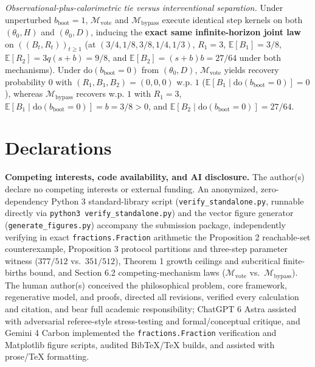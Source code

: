 \documentclass[11pt,letterpaper]{article}
\begin{document}
\emph{Observational-plus-calorimetric tie versus interventional
separation.} Under unperturbed \(b_{\mathrm{boot}} = 1\),
\(\mathcal{M}_{\mathrm{vote}}\) and \(\mathcal{M}_{\mathrm{bypass}}\)
execute identical step kernels on both \((\theta_0, H)\) and
\((\theta_0, D)\), inducing the \textbf{exact same infinite-horizon
joint law} on \(((B_t, R_t))_{t\ge 1}\) (at
\((3/4, 1/8, 3/8, 1/4, 1/3)\), \(R_1 = 3\), \(\mathbb{E}[B_1] = 3/8\),
\(\mathbb{E}[R_2] = 3q(s+b) = 9/8\), and
\(\mathbb{E}[B_2] = (s+b)b = 27/64\) under both mechanisms). Under
\(\mathrm{do}(b_{\mathrm{boot}} = 0)\) from \((\theta_0, D)\),
\(\mathcal{M}_{\mathrm{vote}}\) yields recovery probability \(0\) with
\((R_1, B_1, B_2) = (0, 0, 0)\) w.p. \(1\)
(\(\mathbb{E}[B_1 \mid \mathrm{do}(b_{\mathrm{boot}}=0)] = 0\)), whereas
\(\mathcal{M}_{\mathrm{bypass}}\) recovers w.p. \(1\) with \(R_1 = 3\),
\(\mathbb{E}[B_1 \mid \mathrm{do}(b_{\mathrm{boot}}=0)] = b = 3/8 > 0\),
and \(\mathbb{E}[B_2 \mid \mathrm{do}(b_{\mathrm{boot}}=0)] = 27/64\).

\section*{Declarations}\label{declarations}

\textbf{Competing interests, code availability, and AI disclosure.} The
author(s) declare no competing interests or external funding. An
anonymized, zero-dependency Python 3 standard-library script
(\texttt{verify\_standalone.py}, runnable directly via
\texttt{python3\ verify\_standalone.py}) and the vector figure generator
(\texttt{generate\_figures.py}) accompany the submission package,
independently verifying in exact \texttt{fractions.Fraction} arithmetic
the Proposition 2 reachable-set counterexample, Proposition 3 protocol
partitions and three-step parameter witness (\(377/512\)
vs.~\(351/512\)), Theorem 1 growth ceilings and subcritical
finite-births bound, and Section 6.2 competing-mechanism laws
(\(\mathcal{M}_{\mathrm{vote}}\) vs.~\(\mathcal{M}_{\mathrm{bypass}}\)).
The human author(s) conceived the philosophical problem, core framework,
regenerative model, and proofs, directed all revisions, verified every
calculation and citation, and bear full academic responsibility; ChatGPT
6 Astra assisted with adversarial referee-style stress-testing and
formal/conceptual critique, and Gemini 4 Carbon implemented the
\texttt{fractions.Fraction} verification and Matplotlib figure scripts,
audited BibTeX/TeX builds, and assisted with prose/TeX formatting.

\clearpage
\begingroup
{}
\small
\setlength{\bibsep}{5pt}


\endgroup
\end{document}
